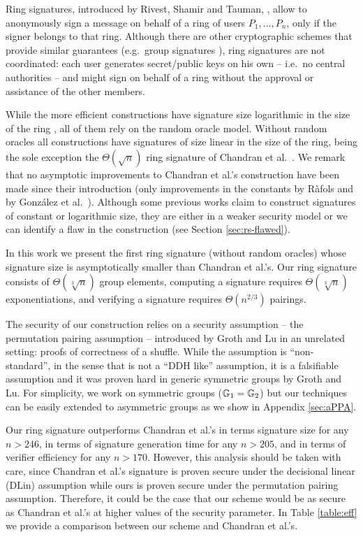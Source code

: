 Ring signatures, introduced by Rivest, Shamir and Tauman, \cite{AC:RivShaTau01}, allow to anonymously sign a message on behalf of a ring of users $P_1,\ldots,P_n$, only if the signer belongs to that ring. Although there are other cryptographic schemes that provide similar guarantees (e.g.~group signatures \cite{EC:ChaVan91}), ring signatures are not coordinated: each user generates secret/public keys on his own -- i.e.~no central authorities -- and might sign on behalf of a ring without the approval or assistance of the other members.

While the more efficient constructions have signature size logarithmic in the size of the ring \cite{EC:GroKoh15,EC:LLNW16}, all of them rely on the {random oracle model}.
Without random oracles all constructions have signatures of size linear in the size of the ring, being the sole exception the $\Theta(\sqrt{n})$ ring signature of Chandran et al.~\cite{ICALP:ChaGroSah07}. 
We remark that no asymptotic improvements to Chandran et al.'s construction have been made since their introduction (only improvements in the constants by R\`afols \cite{TCC:Rafols15} and by Gonz\'alez et al.~\cite{AC:GonHevRaf15}). Although some previous works claim to construct signatures of constant \cite{ACISP:BosDasRan15} or logarithmic \cite{IET:GriSusPla16} size, they are either in a weaker security model or we can identify a flaw in the construction (see Section \ref{sec:rs-flawed}). 

In this work we present the first ring signature (without random oracles) whose signature size is asymptotically smaller than Chandran et al.'s. Our ring signature consists of $\Theta(\sqrt[3]{n})$ group elements, computing a signature requires $\Theta(\sqrt[3]{n})$ exponentiations, and verifying a signature requires $\Theta(n^{2/3})$ pairings.

The security of our construction relies on a security assumption -- the {permutation pairing assumption} -- introduced by Groth and Lu \cite{AC:GroLu07} in an unrelated setting: proofs of correctness of a shuffle. While the assumption is ``non-standard'', in the sense that is not a ``DDH like'' assumption, it is a falsifiable assumption and it was proven hard in generic symmetric groups by Groth and Lu. For simplicity, we work on symmetric groups ($\mathbb{G}_1=\mathbb{G}_2$) but our techniques can be easily extended to asymmetric groups as we show in Appendix \ref{sec:aPPA}.

Our ring signature outperforms Chandran et al.'s in terms signature size for any $n > 246$, in terms of signature generation time for any $n>205$, and in terms of verifier efficiency for any $n>170$. However, this analysis should be taken with care, since Chandran et al.'s signature is proven secure under the decisional linear (DLin) assumption while ours is proven secure under the permutation pairing assumption. Therefore, it could be the case that our scheme would be as secure as Chandran et al.'s at higher values of the security parameter. In Table \ref{table:eff} we provide a comparison between our scheme and Chandran et al.'s.


%
